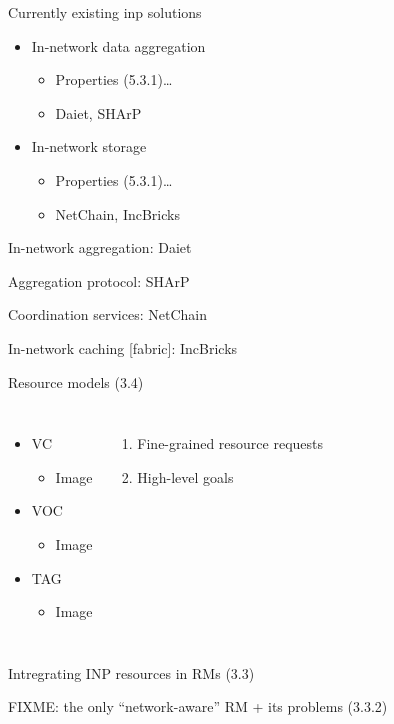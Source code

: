 \begin{frame}{Currently existing \gls{inp} solutions}
	\begin{itemize}
		\item In-network data aggregation
    \begin{itemize}
      \item Properties (5.3.1)…
      \item Daiet, SHArP
    \end{itemize}
		\item In-network storage
    \begin{itemize}
      \item Properties (5.3.1)…
      \item NetChain, IncBricks
    \end{itemize}
	\end{itemize}
\end{frame}
\begin{frame}{In-network aggregation: Daiet}
\end{frame}
\begin{frame}{Aggregation protocol: SHArP}
\end{frame}
\begin{frame}{Coordination services: NetChain}
\end{frame}
\begin{frame}{In-network caching [fabric]: IncBricks}
\end{frame}
\begin{frame}{Resource models (3.4)}
  \begin{columns}[T,onlytextwidth]
      \begin{itemize}
        \item VC
        \begin{itemize}
          \item Image
        \end{itemize}
        \item VOC
        \begin{itemize}
          \item Image
        \end{itemize}
        \item TAG
        \begin{itemize}
          \item Image
        \end{itemize}
      \end{itemize}

      \begin{enumerate}
        \item Fine-grained resource requests
        \item High-level goals
      \end{enumerate}
  \end{columns}
\end{frame}
\begin{frame}{Intregrating INP resources in RMs}
  (3.3)
\end{frame}
\begin{frame}{FIXME: the only “network-aware” RM + its problems}
  (3.3.2)
\end{frame}

